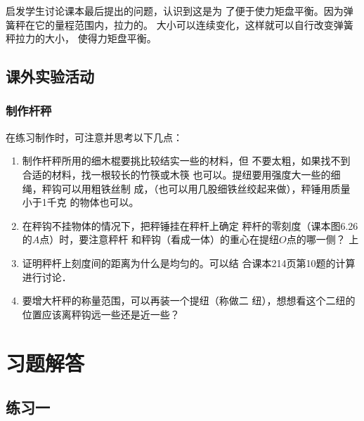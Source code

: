启发学生讨论课本最后提出的问题，认识到这是为
了便于使力矩盘平衡。因为弹簧秤在它的量程范围内，拉力的。
大小可以连续变化，这样就可以自行改变弹簧秤拉力的大小，
使得力矩盘平衡。

\subsection{课外实验活动}
\subsubsection{制作杆秤}
在练习制作时，可注意并思考以下几点：
\begin{enumerate}
\item 制作杆秤所用的细木棍要挑比较结实一些的材料，但
不要太粗，如果找不到合适的材料，找一根较长的竹筷或木筷
也可以。提纽要用强度大一些的细绳，秤钩可以用粗铁丝制
成，（也可以用几股细铁丝绞起来做），秤锤用质量小于1千克
的物体也可以。
\item 在秤钩不挂物体的情况下，把秤锤挂在秤杆上确定
秤杆的零刻度（课本图6.26的$A$点）时，要注意秤杆
和秤钩（看成一体）的重心在提纽$O$点的哪一侧？
上
\item 证明秤杆上刻度间的距离为什么是均匀的。可以结
合课本214页第10题的计算进行讨论．
\item 要增大杆秤的称量范围，可以再装一个提纽（称做二
纽），想想看这个二纽的位置应该离秤钩远一些还是近一些？
\end{enumerate}


\section{习题解答}

\subsection{练习一}


